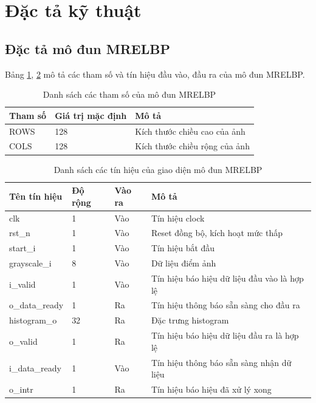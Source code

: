 \section{ Đặc tả kỹ thuật}



\subsection{Đặc tả mô đun MRELBP}

Bảng \ref{tab:paramListMRELBP}, \ref{tab:signalListMRELBP} mô tả các tham số và tín hiệu đầu vào, đầu ra của mô đun MRELBP. 
\begin{table}[h]
    \centering
    \renewcommand{\arraystretch}{1.3} %
    \begin{tabular}{|p{3cm} p{4cm} p{8cm}|}
        \hline
        \rowcolor{gray!30}
        \textbf{Tham số } & \textbf{Giá trị mặc định}  & \textbf{Mô tả} \\
        \hline
        ROWS & 128 & Kích thước chiều cao của ảnh
        \\ \hline
        COLS & 128 & Kích thước chiều rộng của ảnh
        \\ \hline
    \end{tabular}
    \caption{Danh sách các tham số của mô đun MRELBP }
    \label{tab:paramListMRELBP}
\end{table}

\begin{table}[h]
    \centering
    \renewcommand{\arraystretch}{1.3} %
    \begin{tabular}{|p{3cm} p{2cm} p{2cm} p{8cm}|}
        \hline
        \rowcolor{gray!30}
        \textbf{Tên tín hiệu} & \textbf{Độ rộng} & \textbf{Vào ra} & \textbf{Mô tả} \\
        \hline
        clk & 1 & Vào & Tín hiệu clock \\
        \hline
        rst\_n & 1 & Vào & Reset đồng bộ, kích hoạt mức thấp \\
        \hline
        start\_i & 1 & Vào & Tín hiệu bắt đầu
        \\ \hline
        grayscale\_i & 8 & Vào & Dữ liệu điểm ảnh 
        \\ \hline
        i\_valid & 1 & Vào & Tín hiệu báo hiệu dữ liệu đầu vào là hợp lệ
        \\ \hline
        o\_data\_ready & 1 & Ra & Tín hiệu thông báo sẵn sàng cho đầu ra
        \\ \hline
        histogram\_o & 32 & Ra & Đặc trưng histogram
        \\ \hline
        o\_valid & 1 & Ra & Tín hiệu báo hiệu dữ liệu đầu ra là hợp lệ
        \\ \hline
        i\_data\_ready & 1 & Vào & Tín hiệu thông báo sẵn sàng nhận dữ liệu
        \\ \hline
        o\_intr & 1 & Ra &Tín hiệu báo hiệu đã xử lý xong
        \\ \hline
    \end{tabular}
    \caption{Danh sách các tín hiệu của giao diện mô đun MRELBP}
    \label{tab:signalListMRELBP}
\end{table}


